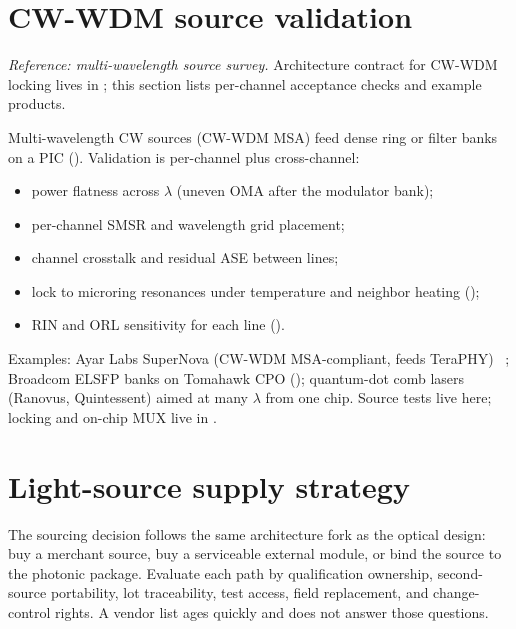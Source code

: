 \section{CW-WDM source validation}
\label{sec:cwwdm-laser}

\textit{Reference: multi-wavelength source survey.} Architecture contract for
CW-WDM locking lives in ; this section lists per-channel acceptance
checks and example products.

Multi-wavelength CW sources (CW-WDM MSA) feed dense ring or filter banks on a PIC
(). Validation is per-channel plus cross-channel:

\begin{itemize}
\item power flatness across $\lambda$ (uneven OMA after the modulator bank);
\item per-channel SMSR and wavelength grid placement;
\item channel crosstalk and residual ASE between lines;
\item lock to microring resonances under temperature and neighbor heating
      ();
\item RIN and ORL sensitivity for each line ().
\end{itemize}

Examples: Ayar Labs SuperNova (CW-WDM MSA-compliant, feeds TeraPHY)
~; Broadcom ELSFP banks on Tomahawk CPO
(); quantum-dot comb lasers (Ranovus, Quintessent)
aimed at many $\lambda$ from one chip. Source tests live here; locking and on-chip
MUX live in .

\section{Light-source supply strategy}
\label{sec:laser-suppliers}

The sourcing decision follows the same architecture fork as the optical design:
buy a merchant source, buy a serviceable external module, or bind the source to
the photonic package. Evaluate each path by qualification ownership, second-source
portability, lot traceability, test access, field replacement, and change-control
rights. A vendor list ages quickly and does not answer those questions.

